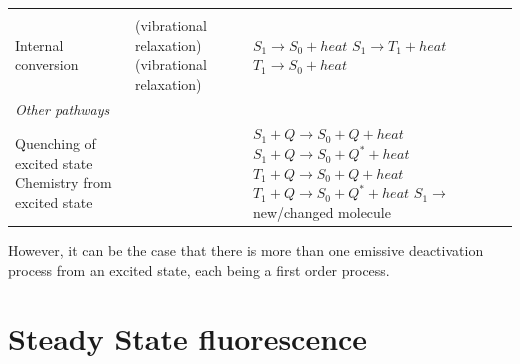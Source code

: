 \documentclass[
]{book}
\begin{document}
\begin{longtable}[]{@{}lll@{}}
\begin{minipage}[t]{0.33\columnwidth}
\end{minipage} & \begin{minipage}[t]{0.23\columnwidth}\raggedright
\strut
\end{minipage}\tabularnewline
\begin{minipage}[t]{0.35\columnwidth}\raggedright
Internal conversion \strut
\end{minipage} & \begin{minipage}[t]{0.33\columnwidth}\raggedright
(vibrational relaxation) (vibrational relaxation)\strut
\end{minipage} & \begin{minipage}[t]{0.23\columnwidth}\raggedright
\(S_1 \longrightarrow S_0 + heat\) \(S_1 \longrightarrow T_1 + heat\) \(T_1 \longrightarrow S_0 + heat\)\strut
\end{minipage}\tabularnewline
\begin{minipage}[t]{0.35\columnwidth}\raggedright
\emph{Other pathways}\strut
\end{minipage} & \begin{minipage}[t]{0.33\columnwidth}\raggedright
\strut
\end{minipage} & \begin{minipage}[t]{0.23\columnwidth}\raggedright
\strut
\end{minipage}\tabularnewline
\begin{minipage}[t]{0.35\columnwidth}\raggedright
Quenching of excited state Chemistry from excited state\strut
\end{minipage} & \begin{minipage}[t]{0.33\columnwidth}\raggedright
\strut
\end{minipage} & \begin{minipage}[t]{0.23\columnwidth}\raggedright
\(S_1 + Q \longrightarrow S_0 + Q +heat\) \(S_1 + Q \longrightarrow S_0 + Q^\ast +heat\) \(T_1 + Q \longrightarrow S_0 + Q +heat\) \(T_1 + Q \longrightarrow S_0 + Q^\ast +heat\) \(S_1 \longrightarrow\) new/changed molecule\strut
\end{minipage}\tabularnewline
\bottomrule
\end{longtable}

However, it can be the case that there is more than one emissive deactivation process from an excited state, each being a first order process.

\hypertarget{steady-state-fluorescence}{%
\section{Steady State fluorescence}\label{steady-state-fluorescence}}
\end{document}
